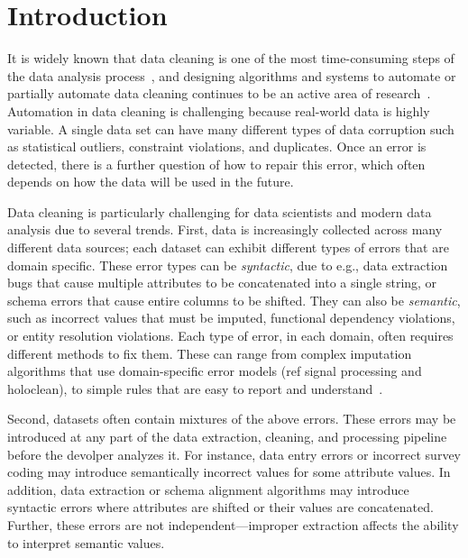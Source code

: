 \section{Introduction}\label{intro}\sloppy

It is widely known that data cleaning is one of the most time-consuming steps of the data analysis process~\cite{nytimes}, and designing algorithms and systems to automate or partially automate data cleaning continues to be an active area of research~\cite{DBLP:conf/sigmod/ChuIKW16}.  Automation in data cleaning is challenging because real-world data is highly variable.  A single data set can have many different types of data corruption such as statistical outliers, constraint violations, and duplicates.  Once an error is detected, there is a further question of how to repair this error, which often depends on how the data will be used in the future.


Data cleaning is particularly challenging for data scientists and modern data analysis due to several trends.  First, data is increasingly collected across many different data sources; each dataset can exhibit different types of errors that are domain specific.  These error types can be {\it syntactic}, due to e.g., data extraction bugs that cause multiple attributes to be concatenated into a single string, or schema errors that cause entire columns to be shifted.  They can also be {\it semantic}, such as incorrect values that must be imputed, functional dependency violations, or entity resolution violations.   Each type of error, in each domain, often requires different methods to fix them.  These can range from complex imputation algorithms that use domain-specific error models (ref signal processing and holoclean), to simple rules that are easy to report and understand~\cite{}.  

Second, datasets often contain mixtures of the above errors.  These errors may be introduced at any part of the data extraction, cleaning, and processing pipeline before the devolper analyzes it.  For instance, data entry errors or incorrect survey coding may introduce semantically incorrect values for some attribute values.  In addition, data extraction or schema alignment algorithms may introduce syntactic errors where attributes are shifted or their values are concatenated.  Further, these errors are not independent---improper extraction affects the ability to interpret semantic values.  

